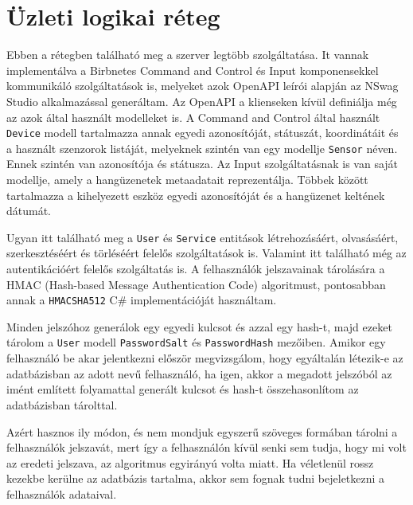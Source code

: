 \section{Üzleti logikai réteg}
Ebben a rétegben található meg a szerver legtöbb szolgáltatása. It vannak implementálva a Birbnetes Command and Control és Input komponensekkel kommunikáló szolgáltatások is, 
melyeket azok OpenAPI leírói alapján az NSwag Studio \cite{nswag-studio} alkalmazással generáltam. Az OpenAPI a klienseken kívül definiálja még az azok által használt modelleket is.
A Command and Control által használt \verb+Device+ modell tartalmazza annak egyedi azonosítóját, státuszát, koordinátáit és a használt szenzorok listáját, 
melyeknek szintén van egy modellje \verb+Sensor+ néven. Ennek szintén van azonosítója és státusza. Az Input szolgáltatásnak is van saját modellje, 
amely a hangüzenetek metaadatait reprezentálja. Többek között tartalmazza a kihelyezett eszköz egyedi azonosítóját és a hangüzenet keltének dátumát. 

Ugyan itt található meg a \verb+User+ és \verb+Service+ entitások létrehozásáért, olvasásáért, szerkesztéséért és törléséért felelős szolgáltatások is.
Valamint itt található még az autentikációért felelős szolgáltatás is. A felhasználók jelszavainak tárolására a HMAC (Hash-based Message Authentication Code) algoritmust, 
pontosabban annak a \verb+HMACSHA512+ \cite{hmacsha512} C\# implementációját használtam. 

Minden jelszóhoz generálok egy egyedi kulcsot és azzal egy hash-t, majd ezeket tárolom a \verb+User+ modell \verb+PasswordSalt+ és \verb+PasswordHash+ mezőiben.
Amikor egy felhasználó be akar jelentkezni először megvizsgálom, hogy egyáltalán létezik-e az adatbázisban az adott nevű felhasználó, 
ha igen, akkor a megadott jelszóból az imént említett folyamattal generált kulcsot és hash-t összehasonlítom az adatbázisban tárolttal.

Azért hasznos ily módon, és nem mondjuk egyszerű szöveges formában tárolni a felhasználók jelszavát, mert így a felhasználón kívül senki sem tudja, hogy mi volt az eredeti jelszava,
az algoritmus egyirányú volta miatt\footnotemark. Ha véletlenül rossz kezekbe kerülne az adatbázis tartalma, akkor sem fognak tudni bejeletkezni a felhasználók adataival.

